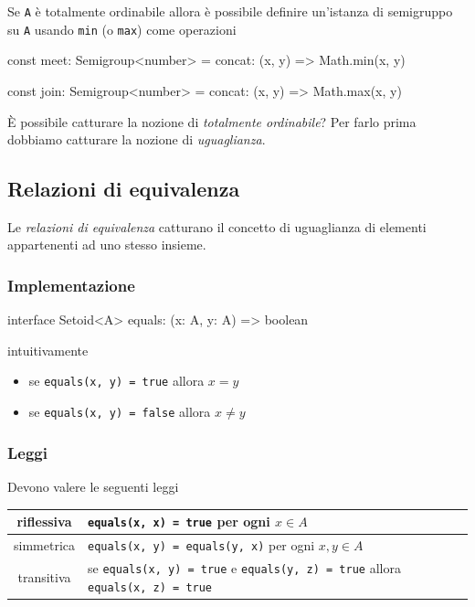 \documentclass[12pt]{article}
\theoremstyle{definition}
\newenvironment{code}
  {\vspace{0.5cm} \VerbatimEnvironment\begin{typescriptcode}}
  {\end{typescriptcode} \vspace{0.2cm}}
\begin{document}
Se \texttt{A} è totalmente ordinabile allora è possibile definire un'istanza di semigruppo su \texttt{A}
usando \texttt{min} (o \texttt{max}) come operazioni

\begin{code}
const meet: Semigroup<number> = {
  concat: (x, y) => Math.min(x, y)
}

const join: Semigroup<number> = {
  concat: (x, y) => Math.max(x, y)
}
\end{code}

È possibile catturare la nozione di \emph{totalmente ordinabile}? Per farlo prima dobbiamo catturare la nozione di \emph{uguaglianza}.

\subsection{Relazioni di equivalenza}

Le \emph{relazioni di equivalenza} catturano il concetto di uguaglianza di elementi appartenenti ad uno stesso insieme.

\subsubsection{Implementazione}

\begin{code}
interface Setoid<A> {
  equals: (x: A, y: A) => boolean
}
\end{code}

intuitivamente

\begin{itemize}
\item se \texttt{equals(x, y) = true} allora $x = y$
\item se \texttt{equals(x, y) = false} allora $x \neq y$
\end{itemize}

\subsubsection{Leggi}

Devono valere le seguenti leggi

\begin{center}
\bgroup
\def\arraystretch{1.5}
\begin{tabular}{ |c|p{10cm}| }
\hline
riflessiva & \texttt{equals(x, x) = true} per ogni $x \in A$ \\
\hline
simmetrica & \texttt{equals(x, y) = equals(y, x)} per ogni $x, y \in A$ \\
\hline
transitiva & se \texttt{equals(x, y) = true} e \texttt{equals(y, z) = true} allora \texttt{equals(x, z) = true} \\
\hline
\end{tabular}
\egroup
\end{center}
\end{document}
